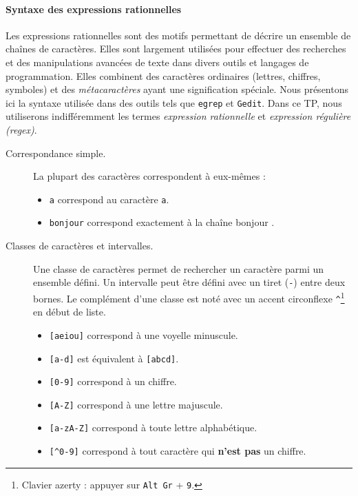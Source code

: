 \documentclass[correction]{td}
\begin{document}
\paragraph{Syntaxe des expressions rationnelles}
Les expressions rationnelles sont des motifs permettant de décrire un ensemble de chaînes de caractères.
Elles sont largement utilisées pour effectuer des recherches et des manipulations avancées de texte dans divers outils et langages de programmation.
Elles combinent des caractères ordinaires (lettres, chiffres, symboles) et des \emph{métacaractères} ayant une signification spéciale.
Nous présentons ici la syntaxe utilisée dans des outils tels que \texttt{egrep} et \texttt{Gedit}.
Dans ce TP, nous utiliserons indifféremment les termes \emph{expression rationnelle} et \emph{expression régulière (regex)}.

\begin{description}
\item[Correspondance simple.] La plupart des caractères correspondent à eux-mêmes :
  \begin{itemize}
  \item \lstinline{a} correspond au caractère \texttt{a}.
  \item \lstinline{bonjour} correspond exactement à la chaîne \og bonjour \fg.
  \end{itemize}

\item[Classes de caractères et intervalles.] Une classe de caractères permet de rechercher un caractère parmi un ensemble défini.
  Un intervalle peut être défini avec un tiret (\lstinline{-}) entre deux bornes. 
  Le complément d'une classe est noté avec un accent circonflexe \lstinline{^}\footnote{Clavier azerty : appuyer sur \texttt{Alt Gr} + \texttt{9}.} en début de liste.
  \begin{itemize}
  \item \lstinline{[aeiou]} correspond à une voyelle minuscule.
  \item \lstinline{[a-d]} est équivalent à \lstinline{[abcd]}.
  \item \lstinline{[0-9]} correspond à un chiffre.
  \item \lstinline{[A-Z]} correspond à une lettre majuscule.
  \item \lstinline{[a-zA-Z]} correspond à toute lettre alphabétique.
  \item \lstinline{[^0-9]} correspond à tout caractère qui \textbf{n'est pas} un chiffre.
  \end{itemize}


\end{description}
\end{document}
